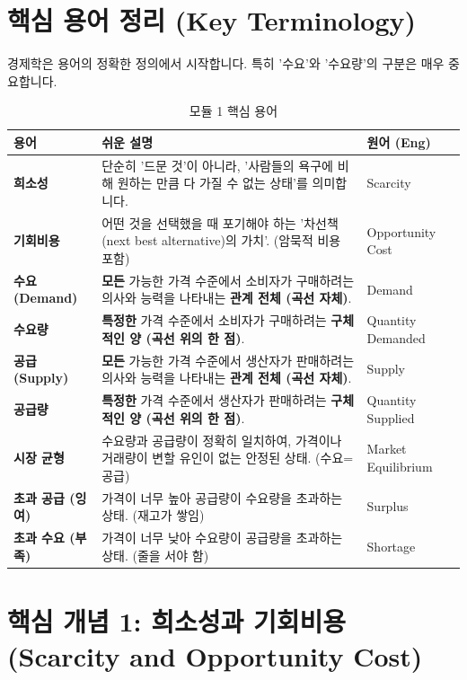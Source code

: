 \documentclass[11pt,a4paper]{book}
\theoremstyle{definition}
\begin{document}
\section{핵심 용어 정리 (Key Terminology)}

경제학은 용어의 정확한 정의에서 시작합니다. 특히 '수요'와 '수요량'의 구분은 매우 중요합니다.

\begin{table}[h!]
\centering
\caption{모듈 1 핵심 용어}
\label{tab:key_terms}
\small
\begin{tabularx}{\textwidth}{>{\raggedright\arraybackslash}p{2.5cm} >{\raggedright\arraybackslash}X >{\raggedright\arraybackslash}p{3cm}}
\toprule
\textbf{용어} & \textbf{쉬운 설명} & \textbf{원어 (Eng)} \\
\midrule
\textbf{희소성} & 단순히 '드문 것'이 아니라, '사람들의 욕구에 비해 원하는 만큼 다 가질 수 없는 상태'를 의미합니다. & Scarcity \\
\textbf{기회비용} & 어떤 것을 선택했을 때 포기해야 하는 '차선책(next best alternative)의 가치'. (암묵적 비용 포함) & Opportunity Cost \\
\textbf{수요 (Demand)} & \textbf{모든} 가능한 가격 수준에서 소비자가 구매하려는 의사와 능력을 나타내는 \textbf{관계 전체 (곡선 자체)}. & Demand \\
\textbf{수요량} & \textbf{특정한} 가격 수준에서 소비자가 구매하려는 \textbf{구체적인 양 (곡선 위의 한 점)}. & Quantity Demanded \\
\textbf{공급 (Supply)} & \textbf{모든} 가능한 가격 수준에서 생산자가 판매하려는 의사와 능력을 나타내는 \textbf{관계 전체 (곡선 자체)}. & Supply \\
\textbf{공급량} & \textbf{특정한} 가격 수준에서 생산자가 판매하려는 \textbf{구체적인 양 (곡선 위의 한 점)}. & Quantity Supplied \\
\textbf{시장 균형} & 수요량과 공급량이 정확히 일치하여, 가격이나 거래량이 변할 유인이 없는 안정된 상태. (수요=공급) & Market Equilibrium \\
\textbf{초과 공급 (잉여)} & 가격이 너무 높아 공급량이 수요량을 초과하는 상태. (재고가 쌓임) & Surplus \\
\textbf{초과 수요 (부족)} & 가격이 너무 낮아 수요량이 공급량을 초과하는 상태. (줄을 서야 함) & Shortage \\
\bottomrule
\end{tabularx}
\end{table}


\section{핵심 개념 1: 희소성과 기회비용 (Scarcity and Opportunity Cost)}
\end{document}
